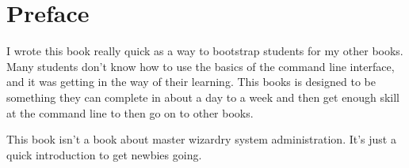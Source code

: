 \chapter*{Preface}

I wrote this book really quick as a way to bootstrap students for my other books.
Many students don't know how to use the basics of the command line interface, and
it was getting in the way of their learning.  This books is designed to be something
they can complete in about a day to a week and then get enough skill at the command
line to then go on to other books.

This book isn't a book about master wizardry system administration.  It's just a quick
introduction to get newbies going.
